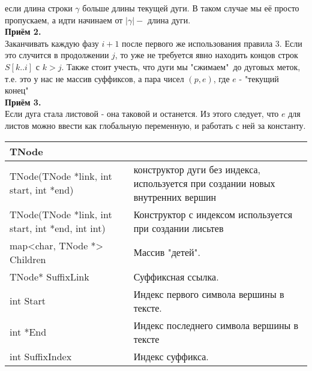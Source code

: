 если длина строки $\gamma$ больше длины текущей дуги. В таком случае мы её просто пропускаем, а идти начинаем от $|\gamma|-$ длина дуги.
\\{\bfseries Приём 2.}
\\Заканчивать каждую фазу $i+1$ после первого же использования правила 3. Если это случится в продолжении $j$, то уже не требуется явно находить
концов строк $S[k..i]$ с $k > j$. Также стоит учесть, что дуги мы "сжимаем"\ до дуговых меток, т.е. это у нас не массив суффиксов, а пара чисел $(p, e)$, 
где $e$ - "текущий конец"\
\\{\bfseries Приём 3.}
\\Если дуга стала листовой - она таковой и останется. Из этого следует, что $e$ для листов можно ввести как глобальную переменную, и работать с 
ней за константу.
\pagebreak

\begin{longtable}{|p{7.5cm}|p{7.5cm}|}
    \hline
    \rowcolor{lightgray}
    \multicolumn{2}{|c|} {TNode}\\
    \hline
    TNode(TNode *link, int start, int *end)&конструктор дуги без индекса, используется при создании новых внутренних вершин\\
    \hline
    \hline
    TNode(TNode *link, int start, int *end, int int)&Конструктор с индексом используется при создании лисьтев\\
    \hline
    map<char, TNode *> Children&Массив "детей".\\
    \hline
    TNode* SuffixLink&Суффиксная ссылка.\\
    \hline
    int Start&Индекс первого символа вершины в тексте.\\
    \hline
    \hline
    int *End&Индекс последнего символа вершины в тексте\\
    \hline
    \hline
    int SuffixIndex&Индекс суффикса.\\
    \hline
\end{longtable}


